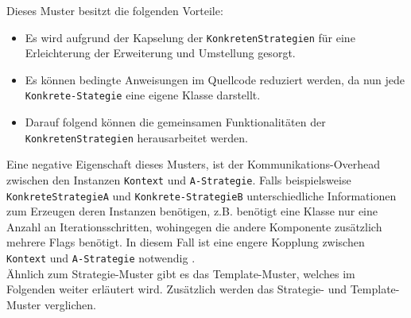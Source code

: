 Dieses Muster besitzt die folgenden Vorteile:\\
\begin{itemize}
\item Es wird aufgrund der Kapselung der \texttt{KonkretenStrategien} für eine Erleichterung der Erweiterung und Umstellung gesorgt.
\item Es können bedingte Anweisungen im Quellcode reduziert werden, da nun jede \texttt{Konkrete-Stategie} eine eigene Klasse darstellt.
\item Darauf folgend können die gemeinsamen Funktionalitäten der \texttt{KonkretenStrategien} herausarbeitet werden.
\end{itemize}
Eine negative Eigenschaft dieses Musters, ist der Kommunikations-Overhead zwischen den Instanzen \texttt{Kontext} und \texttt{A-Strategie}. Falls  beispielsweise \texttt{KonkreteStrategieA} und \texttt{Konkrete-StrategieB} unterschiedliche Informationen zum Erzeugen deren Instanzen benötigen, z.B. benötigt eine Klasse nur eine Anzahl an Iterationsschritten, wohingegen die andere Komponente zusätzlich mehrere Flags benötigt. In diesem Fall ist eine engere Kopplung zwischen \texttt{Kontext} und \texttt{A-Strategie} notwendig \cite[S. 315 ff.]{gamma.2011}.\\
Ähnlich zum Strategie-Muster gibt es das Template-Muster, welches im Folgenden weiter erläutert wird. Zusätzlich werden das Strategie- und Template-Muster verglichen.
